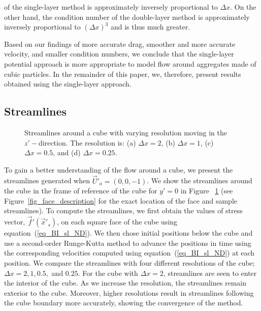 of the single-layer method is approximately inversely proportional to $\Delta x$. 
On the other hand, the condition number of the double-layer method is approximately inversely proportional to $(\Delta x)^{3}$ and is thus much greater.
\par
Based on our findings of more accurate drag, smoother and more accurate velocity, and smaller condition numbers,  we conclude that the single-layer potential approach is more appropriate to model flow around aggregates made of cubic particles. 
In the remainder of this paper, we, therefore, present results obtained using the single-layer approach.
\subsection{Streamlines} 
\label{ch_streamlines}
\begin{figure}[ht]
	\begin{center}
	\end{center}
	\caption{Streamlines around a cube with varying resolution moving in the $z'-$direction. The resolution is: (a) $\Delta x = 2$, (b) $\Delta x = 1$, (c) $\Delta x  =0.5$, and (d) $ \Delta x =0.25$. }
	\label{fig_strlns}
\end{figure}
To gain a better understanding of the flow around a cube, we present the streamlines generated when $\vec{U}'_a = (0,0,-1)$. We show the streamlines around the cube in the frame of reference of the cube for $y' = 0$ in Figure ~\ref{fig_strlns} 
(see Figure~\ref{fig_face_description} for the exact location of the face and sample streamlines).
To compute the streamlines, we first obtain the values of stress vector, $\vec{f}'(\vec{x}'_s)$, on each square face of the cube using equation~(\ref{eq_BI_sl_ND}).
We then chose initial positions below the cube and use a second-order Runge-Kutta method to advance the positions in time using the corresponding velocities computed using equation~(\ref{eq_BI_sl_ND}) at each position. 
We compare the streamlines with four different resolutions of the cube; $\Delta x = 2,1, 0.5,$ and $0.25$. For the cube with $\Delta x = 2$, streamlines are seen to enter the interior of the cube. As we increase the resolution, the streamlines remain exterior to the cube.
Moreover, higher resolutions result in streamlines following the cube boundary more accurately, showing the convergence of the method.
